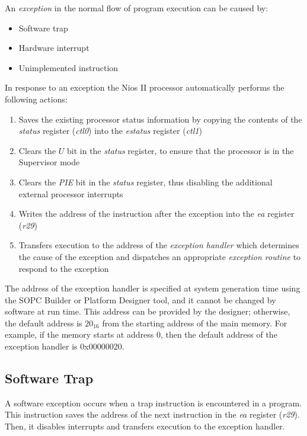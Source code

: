 \documentclass[11pt, twoside, pdftex]{article}
\begin{document}
An {\it exception} in the normal flow of program execution can be caused by:
\begin{itemize}
\item Software trap
\item Hardware interrupt
\item Unimplemented instruction
\end{itemize}
\noindent
In response to an exception the Nios II processor automatically performs the following actions:
\begin{enumerate}
\item Saves the existing processor status information by copying the contents
of the {\it status} register ({\it ctl0}) into the {\it estatus} register ({\it ctl1})

\item Clears the $U$ bit in the {\it status} register, to ensure that the processor
is in the Supervisor mode

\item Clears the {\it PIE} bit in the {\it status} register, thus disabling the
additional external processor interrupts

\item Writes the address of the instruction after the exception into the {\it ea}
register ({\it r29})

\item Transfers execution to the address of the {\it exception handler} which
determines the cause of the exception and dispatches an appropriate
{\it exception routine} to respond to the exception
\end{enumerate}
\noindent
The address of the exception handler is specified at system generation time
using the SOPC Builder or Platform Designer tool,
and it cannot be changed by software at run time. 
This address can be provided by the designer; otherwise, the default address is
$20_{16}$ from the starting address of the main memory. For example, if the 
memory starts at address 0, then the default address of the exception handler
is 0x00000020.

\subsection{Software Trap}

A software exception occurs when a {\sf trap} instruction is encountered in 
a program. This instruction saves the address of the next instruction in the
{\it ea} register ({\it r29}). Then, it disables interrupts and transfers
execution to the exception handler.
\end{document}
